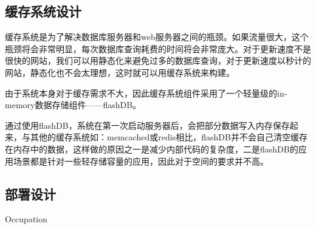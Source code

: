 
\subsection{缓存系统设计}
缓存系统是为了解决数据库服务器和web服务器之间的瓶颈。如果流量很大，这个瓶颈将会非常明显，每次数据库查询耗费的时间将会非常庞大。对于更新速度不是很快的网站，我们可以用静态化来避免过多的数据库查询，对于更新速度以秒计的网站，静态化也不会太理想，这时就可以用缓存系统来构建。

由于系统本身对于缓存需求不大，因此缓存系统组件采用了一个轻量级的in-memory数据存储组件——flashDB。

通过使用flashDB，系统在第一次启动服务器后，会把部分数据写入内存保存起来，与其他的缓存系统如：memcached或redis相比，flashDB并不会自己清空缓存在内存中的数据，这样做的原因之一是减少内部代码的复杂度，二是flashDB的应用场景都是针对一些轻存储容量的应用，因此对于空间的要求并不高。

\subsection{部署设计}
\indent
Occupation


\clearpage
